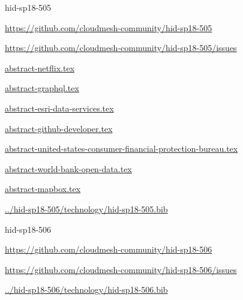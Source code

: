 \begin{IU}

hid-sp18-505

\url{https://github.com/cloudmesh-community/hid-sp18-505}

\url{https://github.com/cloudmesh-community/hid-sp18-505/issues}

\href{https://github.com/cloudmesh-community/hid-sp18-505/blob/master//technology/abstract-netflix.tex}{abstract-netflix.tex}

\href{https://github.com/cloudmesh-community/hid-sp18-505/blob/master//technology/abstract-graphql.tex}{abstract-graphql.tex}

\href{https://github.com/cloudmesh-community/hid-sp18-505/blob/master//technology/abstract-esri-data-services.tex}{abstract-esri-data-services.tex}

\href{https://github.com/cloudmesh-community/hid-sp18-505/blob/master//technology/abstract-github-developer.tex}{abstract-github-developer.tex}

\href{https://github.com/cloudmesh-community/hid-sp18-505/blob/master//technology/abstract-united-states-consumer-financial-protection-bureau.tex}{abstract-united-states-consumer-financial-protection-bureau.tex}

\href{https://github.com/cloudmesh-community/hid-sp18-505/blob/master//technology/abstract-world-bank-open-data.tex}{abstract-world-bank-open-data.tex}

\href{https://github.com/cloudmesh-community/hid-sp18-505/blob/master//technology/abstract-mapbox.tex}{abstract-mapbox.tex}

\href{https://github.com/cloudmesh-community/hid-sp18-505/blob/master//technology/hid-sp18-505.bib}{../hid-sp18-505/technology/hid-sp18-505.bib}

\end{IU}


\begin{IU}

hid-sp18-506

\url{https://github.com/cloudmesh-community/hid-sp18-506}

\url{https://github.com/cloudmesh-community/hid-sp18-506/issues}

\href{https://github.com/cloudmesh-community/hid-sp18-506/blob/master//technology/hid-sp18-506.bib}{../hid-sp18-506/technology/hid-sp18-506.bib}

\end{IU}


